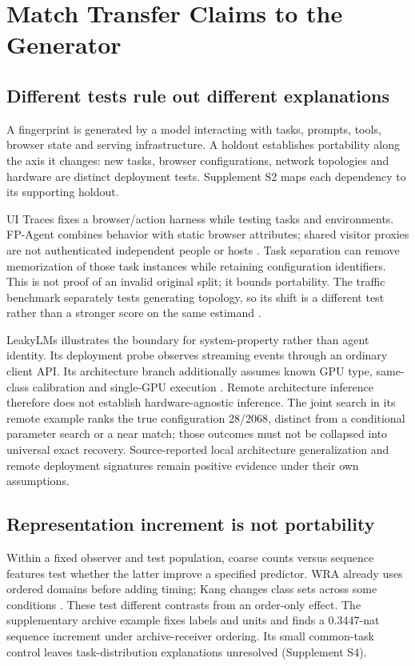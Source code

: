 \section{Match Transfer Claims to the Generator}\label{sec:evaluation}\label{sec:threats}
\subsection{Different tests rule out different explanations}
A fingerprint is generated by a model interacting with tasks, prompts, tools, browser state and serving infrastructure. A holdout establishes portability along the axis it changes: new tasks, browser configurations, network topologies and hardware are distinct deployment tests. Supplement S2 maps each dependency to its supporting holdout.

UI Traces fixes a browser/action harness while testing tasks and environments. FP-Agent combines behavior with static browser attributes; shared visitor proxies are not authenticated independent people or hosts \cite{uitraces2026,wang2026fpagent}. Task separation can remove memorization of those task instances while retaining configuration identifiers. This is not proof of an invalid original split; it bounds portability. The traffic benchmark separately tests generating topology, so its shift is a different test rather than a stronger score on the same estimand \cite{pouryousef2026traffic}.

LeakyLMs illustrates the boundary for system-property rather than agent identity. Its deployment probe observes streaming events through an ordinary client API. Its architecture branch additionally assumes known GPU type, same-class calibration and single-GPU execution \cite{majidi2026leakylms}. Remote architecture inference therefore does not establish hardware-agnostic inference. The joint search in its remote example ranks the true configuration 28/2068, distinct from a conditional parameter search or a near match; those outcomes must not be collapsed into universal exact recovery. Source-reported local architecture generalization and remote deployment signatures remain positive evidence under their own assumptions.

\subsection{Representation increment is not portability}
Within a fixed observer and test population, coarse counts versus sequence features test whether the latter improve a specified predictor. WRA already uses ordered domains before adding timing; Kang changes class sets across some conditions \cite{jeong2026wra,kang2026whoseagent}. These test different contrasts from an order-only effect. The supplementary archive example fixes labels and units and finds a 0.3447-nat sequence increment under archive-receiver ordering. Its small common-task control leaves task-distribution explanations unresolved (Supplement S4).

